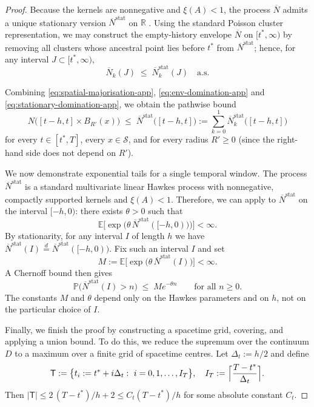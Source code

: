 \documentclass{statsoc}
\newcommand{\bbE}{\mathbb{E}}
\newcommand{\bbP}{\mathbb{P}}
\newcommand{\bbR}{\mathbb{R}}
\newcommand{\1}{\mathbbm{1}}
\begin{document}
\begin{proof}
Because the kernels are nonnegative and $\xi(A)<1$, the process $\overline N$ admits a unique stationary version $\overline N^{\mathrm{stat}}$ on $\bbR$ \citep{bremaud1996stability}. Using the standard Poisson cluster representation, we may construct the empty-history envelope $\overline N$ on $[t^\ast,\infty)$ by removing all clusters whose ancestral point lies before $t^\ast$ from $\overline N^{\mathrm{stat}}$; hence, for any interval $J\subset[t^\ast,\infty)$,
\begin{equation}\label{eq:stationary-domination-app}
  \overline N_k(J) \;\le\; \overline N^{\mathrm{stat}}_k(J)
  \quad\text{a.s.}
\end{equation}

Combining \eqref{eq:spatial-majorisation-app},
\eqref{eq:env-domination-app} and \eqref{eq:stationary-domination-app}, we obtain
the pathwise bound
\begin{equation}\label{eq:window-domination-app}
  N\bigl([t-h,t]\times B_{R'}(x)\bigr)
  \;\le\; \overline N^{\mathrm{stat}}\bigl([t-h,t]\bigr)
  := \sum_{k=0}^1 \overline N^{\mathrm{stat}}_k\bigl([t-h,t]\bigr)
\end{equation}
for every $t\in[t^\ast,T]$, every $x\in\mathcal{S}$, and for every radius $R'\ge 0$
(since the right-hand side does not depend on $R'$).

We now demonstrate exponential tails for a single temporal window. The process $\overline N^{\mathrm{stat}}$ is a standard multivariate linear Hawkes process with nonnegative, compactly supported kernels and $\xi(A)<1$.  Therefore, we can apply \cite[Proposition~2]{hansen2015lasso} to $\overline N^{\mathrm{stat}}$ on the interval $[-h,0)$: there exists $\theta>0$ such that
\[
  \bbE\bigl[\exp\bigl( \theta\,\overline N^{\mathrm{stat}}([-h,0))\bigr)\bigr]
  < \infty.
\]
By stationarity, for any interval $I$ of length $h$ we have
\(
  \overline N^{\mathrm{stat}}(I)
  \stackrel{d}{=} \overline N^{\mathrm{stat}}([-h,0)).
\)
Fix such an interval $I$ and set
\[
  M := \bbE\bigl[\exp\bigl( \theta\,\overline N^{\mathrm{stat}}(I)\bigr)\bigr]
  < \infty.
\]
A Chernoff bound then gives
\begin{equation}\label{eq:single-window-tail-app}
  \bbP\bigl( \overline N^{\mathrm{stat}}(I) > n \bigr)
  \;\le\; M e^{-\theta n}
  \qquad\text{for all }n\ge 0.
\end{equation}
The constants $M$ and $\theta$ depend only on the Hawkes parameters and on
$h$, not on the particular choice of $I$.

Finally, we finish the proof by constructing a spacetime grid, covering, and applying a union bound. To do this, we reduce the supremum over the continuum $D$ to a maximum over a finite grid of spacetime centres. Let $\Delta_t:=h/2$ and define
\[
  \mathsf{T}
  := \bigl\{t_i:=t^\ast+i\Delta_t:\ i=0,1,\dots,I_T\bigr\},
  \quad
  I_T:=\Bigl\lceil\frac{T-t^\ast}{\Delta_t}\Bigr\rceil.
\]
Then
\(
  |\mathsf{T}|
  \le 2\,(T-t^\ast)/h + 2
  \le C_t (T-t^\ast)/h
\)
for some absolute constant $C_t$.


\end{proof}
\end{document}

